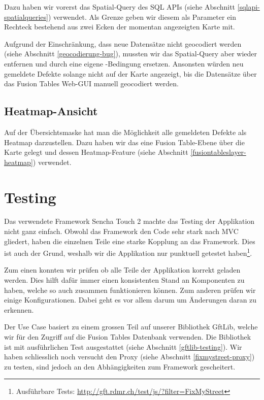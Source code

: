 Dazu haben wir vorerst das Spatial-Query  des SQL \gls{API}s (siehe Abschnitt \ref{sqlapi-spatialqueries}) verwendet. Als Grenze geben wir diesem als Parameter ein Rechteck bestehend aus zwei Ecken der momentan angezeigten Karte mit.

Aufgrund der Einschränkung, dass neue Datensätze nicht geocodiert werden (siehe Abschnitt \ref{geocodierung-bug}), mussten wir das Spatial-Query aber wieder entfernen und durch eine eigene -Bedingung ersetzen. Ansonsten würden neu gemeldete Defekte solange nicht auf der Karte angezeigt, bis die Datensätze über das Fusion Tables Web-GUI manuell geocodiert werden.

\subsection{Heatmap-Ansicht}
\label{fixmystreet-heatmap}
Auf der Übersichtsmaske hat man die Möglichkeit alle gemeldeten Defekte als Heatmap darzustellen. Dazu haben wir das eine Fusion Table-Ebene über die Karte gelegt und dessen Heatmap-Feature (siehe Abschnitt \ref{fusiontableslayer-heatmap}) verwendet. 

\section{Testing}
Das verwendete Framework Sencha Touch 2 machte das Testing der Applikation nicht ganz einfach. Obwohl das Framework den Code sehr stark nach \gls{MVC} gliedert, haben die einzelnen Teile eine starke Kopplung an das Framework. Dies ist auch der Grund, weshalb wir die Applikation nur punktuell getestet haben\footnote{Ausführbare Tests: \url{http://gft.rdmr.ch/test/js/?filter=FixMyStreet}}.

Zum einen konnten wir prüfen ob alle Teile der Applikation korrekt geladen werden. Dies hilft dafür immer einen konsistenten Stand an Komponenten zu haben, welche so auch zusammen funktionieren können. Zum anderen prüfen wir einige Konfigurationen. Dabei geht es vor allem darum um Änderungen daran zu erkennen.

Der Use Case basiert zu einem grossen Teil auf unserer Bibliothek GftLib, welche wir für den Zugriff auf die Fusion Tables Datenbank verwenden. Die Bibliothek ist mit ausführlichen Test ausgestattet (siehe Abschnitt \ref{gftlib-testing}). Wir haben schliesslich noch versucht den Proxy (siehe Abschnitt \ref{fixmystreet-proxy}) zu testen, sind jedoch an den Abhängigkeiten zum Framework gescheitert.

